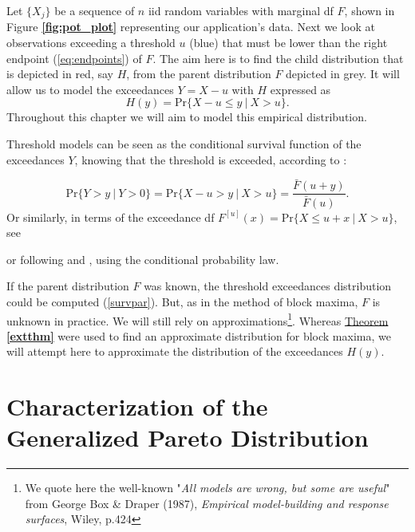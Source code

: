 Let $\{X_j\}$ be a sequence of $n$ iid random variables with marginal df $F$, shown in Figure \textbf{\ref{fig:pot_plot}} representing our application's data. Next we look at observations exceeding a threshold $u$ (blue) that must be lower than the right endpoint (\ref{eq:endpoints}) of $F$. The aim here is to find the child distribution that is depicted in red, say $H$, from the parent distribution $F$ depicted in grey. It will allow us to model the exceedances $Y=X-u$ with $H$ expressed as \begin{equation*}
H(y)=\text{Pr}\{X-u\leq y \ | \ X>u\}.
\end{equation*}
Throughout this chapter we will aim to model this empirical distribution.

Threshold models can be seen as the conditional survival function of the exceedances $Y$, knowing that the threshold is exceeded, according to \citet[pp.147]{beirlant_statistics_2006} :


\begin{equation}\label{survpar}
\text{Pr}\big\{Y>y\ |\ Y>0\big\}=\text{Pr}\big\{X-u>y\ |\ X>u\big\}=\frac{\bar{F}(u+y)}{\bar{F}(u)}.
\end{equation}
Or similarly, in terms of the exceedance df $F^{[u]}(x)=\text{Pr}\{X\leq u+x \ | \ X>u\}$, see \citet[pp.25-29]{reiss_statistical_2007}

or following \citet{charras_extreme_2013} and \citet{rosso_extreme_2015}, using the conditional probability law. %

If the parent distribution $F$ was known, the threshold exceedances distribution could be computed (\ref{survpar}). But, as in the method of block maxima, $F$ is unknown in practice. We will still rely on approximations\footnote{We quote here the well-known "\textit{All models are wrong, but some are useful}" from George Box \& Draper (1987), \textit{Empirical model-building and response surfaces}, Wiley, p.424}. Whereas \hyperref[extthm]{Theorem \textbf{\ref{extthm}}} were used to find an approximate distribution for block maxima, we will attempt here to approximate the distribution of the exceedances $H(y)$.


\section{Characterization of the Generalized Pareto Distribution}\label{sec:charac_gpd}

